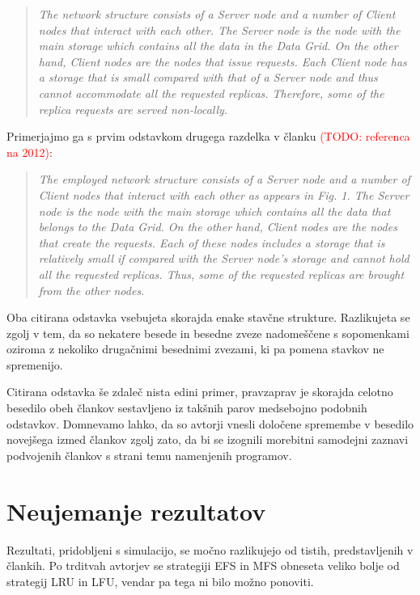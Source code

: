 \documentclass[a4paper, 12pt]{book}
\newcommand{\TODO}[1]{\textcolor{red}{(TODO: #1)}}
\newenvironment{itquote}
{\begin{quote}\itshape}
{\end{quote}}
\begin{document}
\begin{itquote}
The network structure consists of a Server node and a number of
Client nodes that interact with each other. The Server node is the node
with the main storage which contains all the data in the Data Grid. On
the other hand, Client nodes are the nodes that issue requests. Each
Client node has a storage that is small compared with that of a Server
node and thus cannot accommodate all the requested replicas.
Therefore, some of the replica requests are served non-locally.
\end{itquote}

Primerjajmo ga s prvim odstavkom drugega razdelka v članku
\TODO{referenca na 2012}:

\begin{itquote}
The employed network structure consists of a Server node and a number of
Client nodes that interact with each other as appears in Fig. 1. The Server
node is the node with the main storage which contains all the data that
belongs to the Data Grid. On the other hand, Client nodes are the nodes that
create the requests. Each of these nodes includes a storage that is relatively
small if compared with the Server node’s storage and cannot hold all the
requested replicas. Thus, some of the requested replicas are brought from the
other nodes.
\end{itquote}

Oba citirana odstavka vsebujeta skorajda enake stavčne strukture. Razlikujeta
se zgolj v tem, da so nekatere besede in besedne zveze nadomeščene s
sopomenkami oziroma z nekoliko drugačnimi besednimi zvezami, ki pa pomena
stavkov ne spremenijo.

Citirana odstavka še zdaleč nista edini primer, pravzaprav je skorajda
celotno besedilo obeh člankov sestavljeno iz takšnih parov medsebojno podobnih
odstavkov. Domnevamo lahko, da so avtorji vnesli določene spremembe v besedilo
novejšega izmed člankov zgolj zato, da bi se izognili morebitni samodejni
zaznavi podvojenih člankov s strani temu namenjenih programov.

\section{Neujemanje rezultatov}

Rezultati, pridobljeni s simulacijo, se močno razlikujejo od tistih,
predstavljenih v člankih. Po trditvah avtorjev se strategiji EFS in MFS
obneseta veliko bolje od strategij LRU in LFU, vendar pa tega ni bilo možno
ponoviti.
\end{document}
